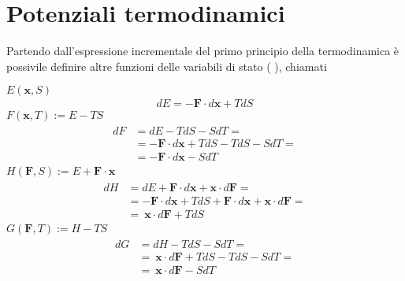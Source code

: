 \documentclass[letterpaper,10pt,english]{jupyterBook}
\begin{document}
\chapter{Potenziali termodinamici}
\label{\detokenize{ch/potentials:potenziali-termodinamici}}\label{\detokenize{ch/potentials:classical-thermodynamics-potentials}}\label{\detokenize{ch/potentials::doc}}
\sphinxAtStartPar
Partendo dall’espressione incrementale del primo principio della termodinamica è possivile definire altre funzioni delle variabili di stato ( ), chiamati 

\sphinxAtStartPar
{} \(E(\mathbf{x}, S)\)
\begin{equation*}
\begin{split}d E = - \mathbf{F} \cdot d \mathbf{x} + T dS\end{split}
\end{equation*}
\sphinxAtStartPar
{} \(F(\mathbf{x}, T) := E - T S\)
\begin{equation*}
\begin{split}\begin{aligned}
d F & = d E - T dS - S dT = \\
    & = - \mathbf{F} \cdot d \mathbf{x} + T dS - T dS - S dT = \\
    & = - \mathbf{F} \cdot d \mathbf{x} - S dT 
\end{aligned}\end{split}
\end{equation*}
\sphinxAtStartPar
{} \(H(\mathbf{F}, S) := E + \mathbf{F} \cdot \mathbf{x}\)
\begin{equation*}
\begin{split}\begin{aligned}
d H & = d E + \mathbf{F} \cdot d \mathbf{x} + \mathbf{x} \cdot d \mathbf{F} = \\
    & = - \mathbf{F} \cdot d \mathbf{x} + T dS + \mathbf{F} \cdot d \mathbf{x} + \mathbf{x} \cdot d \mathbf{F}= \\
    & = \ \mathbf{x} \cdot d \mathbf{F} + T dS 
\end{aligned}\end{split}
\end{equation*}
\sphinxAtStartPar
{} \(G(\mathbf{F}, T) := H - T S\)
\begin{equation*}
\begin{split}\begin{aligned}
d G & = d H - T dS - S dT = \\
    & = \ \mathbf{x} \cdot d \mathbf{F} + T dS - T dS - S dT = \\
    & = \ \mathbf{x} \cdot d \mathbf{F} - S dT 
\end{aligned}\end{split}
\end{equation*}
\end{document}
